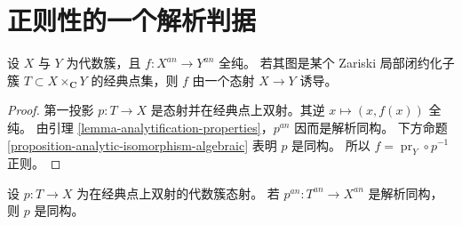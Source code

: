 \section{正则性的一个解析判据}
\label{section-analytic-regularity}

\begin{proposition}
\label{proposition-algebraic-graph-holomorphic-regular}
设 $X$ 与 $Y$ 为代数簇，且 $f : X^{an}\to Y^{an}$ 全纯。
若其图是某个 Zariski 局部闭约化子簇
$T\subset X\times_{\mathbf C}Y$ 的经典点集，则 $f$ 由一个态射 $X\to Y$ 诱导。
\end{proposition}

\begin{proof}
第一投影 $p:T\to X$ 是态射并在经典点上双射。其逆 $x\mapsto(x,f(x))$ 全纯。
由引理 \ref{lemma-analytification-properties}，$p^{an}$ 因而是解析同构。
下方命题 \ref{proposition-analytic-isomorphism-algebraic} 表明 $p$ 是同构。
所以 $f=\operatorname{pr}_Y\circ p^{-1}$ 正则。
\end{proof}

\begin{proposition}
\label{proposition-analytic-isomorphism-algebraic}
设 $p:T\to X$ 为在经典点上双射的代数簇态射。
若 $p^{an}:T^{an}\to X^{an}$ 是解析同构，则 $p$ 是同构。
\end{proposition}

